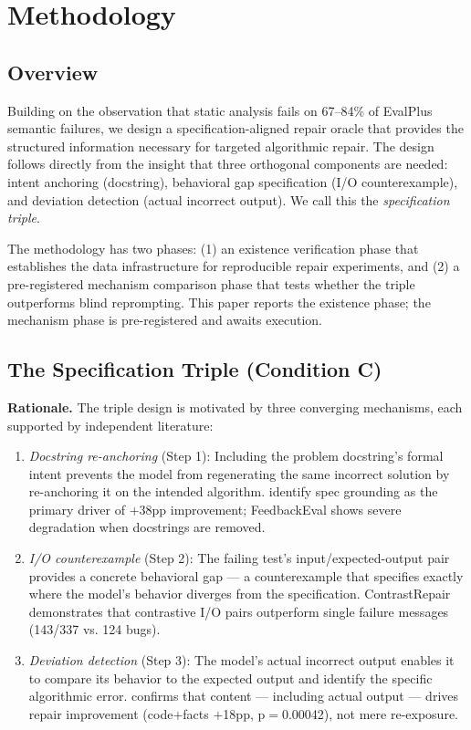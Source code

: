 \section{Methodology}

\subsection{Overview}

Building on the observation that static analysis fails on 67--84\% of EvalPlus semantic
failures, we design a specification-aligned repair oracle that provides the structured
information necessary for targeted algorithmic repair. The design follows directly from
the insight that three orthogonal components are needed: intent anchoring (docstring),
behavioral gap specification (I/O counterexample), and deviation detection (actual
incorrect output). We call this the \textit{specification triple}.

The methodology has two phases: (1) an existence verification phase that establishes
the data infrastructure for reproducible repair experiments, and (2) a pre-registered
mechanism comparison phase that tests whether the triple outperforms blind reprompting.
This paper reports the existence phase; the mechanism phase is pre-registered and
awaits execution.

\subsection{The Specification Triple (Condition C)}

\textbf{Rationale.} The triple design is motivated by three converging mechanisms, each
supported by independent literature:

\begin{enumerate}
\item \textit{Docstring re-anchoring} (Step 1): Including the problem docstring's formal intent
   prevents the model from regenerating the same incorrect solution by re-anchoring
   it on the intended algorithm. \citet{Haeri2026} identify spec grounding as
   the primary driver of $+$38pp improvement; FeedbackEval \citep{Dai2025} shows
   severe degradation when docstrings are removed.

\item \textit{I/O counterexample} (Step 2): The failing test's input/expected-output pair
   provides a concrete behavioral gap --- a counterexample that specifies
   exactly where the model's behavior diverges from the specification.
   ContrastRepair \citep{Kong2024} demonstrates that contrastive I/O pairs
   outperform single failure messages (143/337 vs. 124 bugs).

\item \textit{Deviation detection} (Step 3): The model's actual incorrect output enables it to
   compare its behavior to the expected output and identify the specific algorithmic
   error. \citet{Iscan2026} confirms that content --- including actual output --- drives repair
   improvement (code$+$facts $+$18pp, p$=$0.00042), not mere re-exposure.
\end{enumerate}

